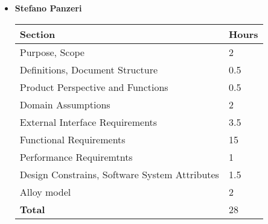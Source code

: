 \begin{itemize}
\item \textbf{Stefano Panzeri}

\begin{table}[!h]
\begin{tabular}{|l|l|}
\hline
 \textbf{Section}														&		\textbf{Hours}  \\ \hline
Purpose, Scope														& 2 	\\ \hline
Definitions, Document Structure							& 0.5 	\\ \hline
Product Perspective and Functions						& 0.5 	\\ \hline
Domain Assumptions												&  2	\\ \hline
External Interface Requirements							& 3.5 	\\ \hline
Functional Requirements										& 15 	\\ \hline
Performance Requiremtnts									&  1	\\ \hline
Design Constrains, Software System Attributes	&  1.5	\\ \hline
Alloy model   &   2    \\ \hline
\textbf{Total}															& 28 	\\ \hline
\end{tabular}
\end{table}


\end{itemize}
